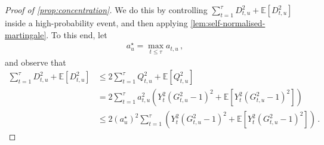 \documentclass[11pt]{article}
\newcommand{\E}{\mathbb E}
\newcommand{\1}{\mathbf 1}
\begin{document}
\begin{proof}[Proof of \cref{prop:concentration}]
    We do this by controlling $\sum_{t=1}^{\tau} D_{t,u}^2 + \E[D_{t,u}^2]$
    inside a high-probability event, and then applying \cref{lem:self-normalised-martingale}.
    To this end, let
    \begin{align}
        a_u^\star = \max_{t\leq\tau} a_{t,u}\,,
    \end{align}
    and observe that
    \begin{align}
        \sum_{t=1}^{\tau} D_{t,u}^2 + \E[D_{t,u}^2]
         & \leq
        2\sum_{t=1}^{\tau} Q_{t,u}^2 + \E[Q_{t,u}^2] \\
         & =
        2\sum_{t=1}^{\tau} a_{t,u}^2\left(Y_t^2(G_{t,u}^2-1)^2
        +
        \E[Y_t^2(G_{t,u}^2-1)^2]\right)              \\
         & \leq
        2(a_u^\star)^2
        \sum_{t=1}^{\tau}
        \left(Y_t^2(G_{t,u}^2-1)^2
        +
        \E[Y_t^2(G_{t,u}^2-1)^2]
        \right)
        \,.
    \end{align}


\end{proof}
\end{document}
